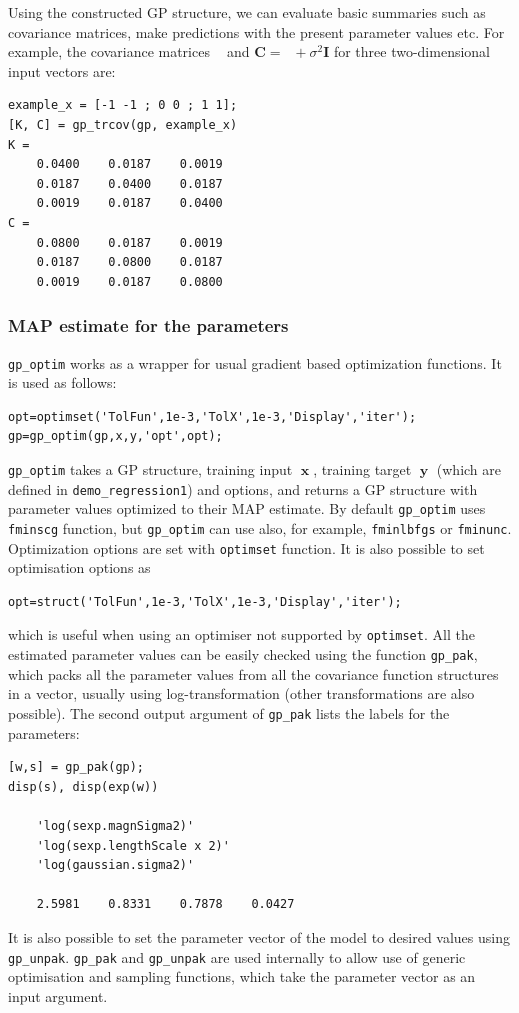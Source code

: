 \documentclass[twoside,11pt]{article}
\DeclareMathOperator{\Kff}{\mathbf{K}_{f,f}}
\DeclareMathOperator{\x}{\mathbf{x}}
\DeclareMathOperator{\y}{\mathbf{y}}
\newcommand{\mb}{\mathbf}
\newcommand{\code}[1]{{\normalfont\texttt{#1}}}
\begin{document}
Using the constructed GP structure, we can evaluate basic summaries
such as covariance matrices, make predictions with the present
parameter values etc. For example, the covariance matrices $\Kff$
and $\mb{C} = \Kff+\sigma^2\mb{I}$ for three two-dimensional
input vectors are:
%
\begin{verbatim}
example_x = [-1 -1 ; 0 0 ; 1 1];
[K, C] = gp_trcov(gp, example_x)
K =
    0.0400    0.0187    0.0019
    0.0187    0.0400    0.0187
    0.0019    0.0187    0.0400
C =
    0.0800    0.0187    0.0019
    0.0187    0.0800    0.0187
    0.0019    0.0187    0.0800
\end{verbatim} 

\subsubsection{MAP estimate for the parameters}

\code{gp\_optim} works as a wrapper for usual gradient based
optimization functions. It is used as follows:
%
\begin{verbatim}
opt=optimset('TolFun',1e-3,'TolX',1e-3,'Display','iter');
gp=gp_optim(gp,x,y,'opt',opt);
\end{verbatim}
\code{gp\_optim} takes a GP structure, training input $\x$,
training target $\y$ (which are defined in
\code{demo\_regression1}) and options, and returns a GP structure
with parameter values optimized to their MAP estimate. By default
\code{gp\_optim} uses \code{fminscg} function, but \code{gp\_optim}
can use also, for example, \code{fminlbfgs} or \code{fminunc}.
Optimization options are set with \code{optimset} function. It is
also possible to set optimisation options as
\begin{verbatim}
opt=struct('TolFun',1e-3,'TolX',1e-3,'Display','iter');
\end{verbatim}
which is useful when using an optimiser not supported by \code{optimset}.
%
All the estimated parameter values can be easily checked using the
function \code{gp\_pak}, which packs all the parameter values from
all the covariance function structures in a vector, usually using
log-transformation (other transformations are also possible). The
second output argument of \code{gp\_pak} lists the labels for the
parameters:
%
\begin{verbatim}
[w,s] = gp_pak(gp);
disp(s), disp(exp(w))

    'log(sexp.magnSigma2)'
    'log(sexp.lengthScale x 2)'
    'log(gaussian.sigma2)'

    2.5981    0.8331    0.7878    0.0427
\end{verbatim}
% 
It is also possible to set the parameter vector of the model to
desired values using \code{gp\_unpak}. \code{gp\_pak} and
\code{gp\_unpak} are used internally to allow use of generic
optimisation and sampling functions, which take the parameter
vector as an input argument.
\end{document}
